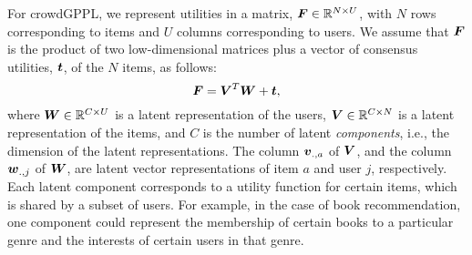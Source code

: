For crowdGPPL, 
we represent utilities in a matrix, $\boldsymbol{F} \in \mathbb{R}^{N \times U}$,
with $N$ rows corresponding to items and $U$ columns corresponding to users. %
We assume that $\boldsymbol F$ is the product of two low-dimensional matrices
plus a vector of consensus utilities, $\boldsymbol{t}$, of the $N$ items, as follows:
\begin{equation}
\boldsymbol{F} = \boldsymbol{V}^T \boldsymbol{W} + \boldsymbol{t},
\end{equation}
where $\boldsymbol{W} \in \mathbb{R}^{C \times U}$ is a latent representation
of the users,
$\boldsymbol{V} \in \mathbb{R}^{C \times N}$ is a latent representation of the items,
and $C$ is the number of latent \emph{components}, i.e., the dimension
of the latent representations.
The column $\boldsymbol v_{.,a}$ of $\boldsymbol V$, and the column $\boldsymbol w_{.,j}$ of $\boldsymbol W$,
 are latent vector representations of item $a$ and user $j$,
 respectively.
Each latent component corresponds to a utility function 
for certain items, which is shared by a subset of users.
For example, in the case of book recommendation,
one component could represent the membership of certain books to a particular
genre and the interests of certain users in that genre.

